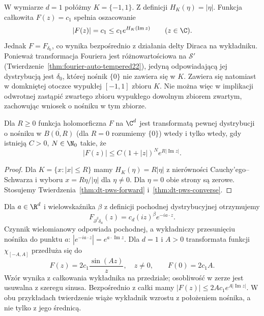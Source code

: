 \begin{przyklad}
\label{ex:dt-pws-nonconvex}
W wymiarze $d=1$ połóżmy $K=\{-1,1\}$.
Z definicji $H_K(\eta)=|\eta|$. Funkcja całkowita
$F(z)=c_1$ spełnia oszacowanie
\[
 |F(z)|=c_1\le c_1 e^{H_K(\operatorname{Im}z)}
 \qquad(z\in\C).
\]
Jednak $F=F_{\delta_0}$, co wynika bezpośrednio
z działania delty Diraca na wykładniku. Ponieważ
transformacja Fouriera jest różnowartościowa na
$\mathcal S'$ (Twierdzenie~\ref{thm:fourier-auto-tempered22}),
jedyną odpowiadającą jej dystrybucją jest $\delta_0$,
której nośnik $\{0\}$ nie zawiera się w $K$.
Zawiera się natomiast w domkniętej otoczce wypukłej
$[-1,1]$ zbioru $K$. Nie można więc w implikacji
odwrotnej zastąpić zwartego zbioru wypukłego dowolnym
zbiorem zwartym, zachowując wniosek o nośniku w tym
zbiorze.
\end{przyklad}

\begin{wniosek}
\label{cor:dt-pws-ball}
Dla $R\ge0$ funkcja holomorficzna $F$ na $\C^d$
jest transformatą pewnej dystrybucji o nośniku
w $\overline{B(0,R)}$ (dla $R=0$ rozumiemy $\{0\}$)
wtedy i tylko wtedy, gdy istnieją $C>0$, $N\in\N_0$
takie, że
\[
 |F(z)|\le C(1+|z|)^N e^{R|\operatorname{Im}z|}.
\]
\end{wniosek}
\begin{proof}
Dla $K=\{x:|x|\le R\}$ mamy $H_K(\eta)=R|\eta|$
z nierówności Cauchy'ego--Schwarza i wyboru
$x=R\eta/|\eta|$ dla $\eta\ne0$. Dla $\eta=0$
obie strony są zerowe. Stosujemy
Twierdzenia~\ref{thm:dt-pws-forward}
i~\ref{thm:dt-pws-converse}.
\end{proof}

\begin{przyklad}
\label{ex:dt-pws-examples}
Dla $a\in\R^d$ i wielowskaźnika $\beta$
z definicji pochodnej dystrybucyjnej otrzymujemy
\[
 F_{\partial^\beta\delta_a}(z)
 =c_d(iz)^\beta e^{-ia\cdot z}.
\]
Czynnik wielomianowy odpowiada pochodnej,
a wykładniczy przesunięciu nośnika do punktu $a$:
$|e^{-ia\cdot z}|=e^{a\cdot\operatorname{Im}z}$.
Dla $d=1$ i $A>0$ transformata funkcji
$\chi_{[-A,A]}$ przedłuża się do
\[
 F(z)=2c_1\frac{\sin(Az)}{z},\quad z\ne0,\qquad
 F(0)=2c_1A.
\]
Wzór wynika z całkowania wykładnika na przedziale;
osobliwość w zerze jest usuwalna z szeregu sinusa.
Bezpośrednio z całki mamy
$|F(z)|\le2Ac_1 e^{A|\operatorname{Im}z|}$.
W obu przykładach twierdzenie wiąże wykładnik
wzrostu z położeniem nośnika, a nie tylko z jego
średnicą.
\end{przyklad}
